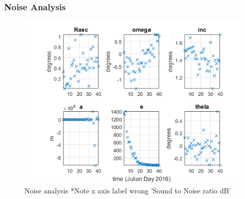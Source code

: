 \documentclass[Space3_Assign1.tex]{subfiles}
\begin{document}
\subsubsection{Noise Analysis}
\begin{figure}[h!]
\centering
\includegraphics[width=1\linewidth]{NOISE}
\caption{Noise analysis *Note x axis label wrong 'Sound to Noise ratio dB'}
\label{fig:NOISE}
\end{figure}
\end{document}
